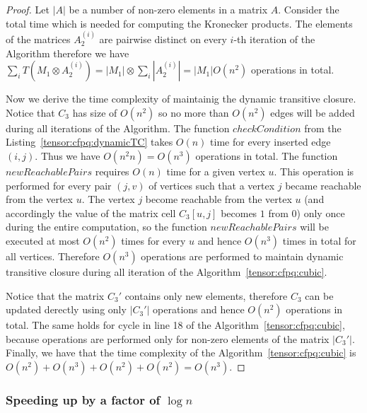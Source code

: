 \begin{proof}
 Let $|A|$ be a number of non-zero elements in a matrix $A$. Consider the total time which is needed for computing the Kronecker products. The elements of the matrices $A_2^{(i)}$ are pairwise distinct on every $i$-th iteration of the Algorithm therefore we have $\sum\limits_i{T(M_1 \otimes A_2^{(i)})} = |M_1| \otimes \sum\limits_i {|A_2^{(i)}|} = |M_1|O(n^2)$ operations in total. 


Now we derive the time complexity of maintainig the dynamic transitive closure. Notice that $C_3$ has size of $O(n^2)$ so no more than $O(n^2)$ edges will be added during all iterations of the Algorithm. The function $checkCondition$ from the Listing~\ref{tensor:cfpq:dynamicTC} takes $O(n)$ time for every inserted edge $(i, j)$. Thus we have $O(n^2n) = O(n^3)$ operations in total. The function $newReachablePairs$ requires $O(n)$ time for a given vertex $u$. This operation is performed for every pair $(j, v)$ of vertices such that a vertex $j$ became reachable from the vertex $u$. The vertex $j$ become reachable from the vertex $u$ (and accordingly the value of the matrix cell $C_3[u, j]$ becomes $1$ from $0$) only once during the entire computation, so the function $newReachablePairs$ will be executed at most $O(n^2)$ times for every $u$ and hence $O(n^3)$ times in total for all vertices. Therefore $O(n^3)$ operations are performed to maintain dynamic transitive closure during all iteration of the Algorithm~\ref{tensor:cfpq:cubic}.


Notice that the matrix $C_3'$ contains only new elements, therefore $C_3$ can be updated derectly using only $|C_3'|$ operations and hence $O(n^2)$ operations in total. The same holds for cycle in line 18 of the Algorithm~\ref{tensor:cfpq:cubic}, because operations are performed only for non-zero elements of the matrix $|C_3'|$. Finally, we have that the time complexity of the Algorithm~\ref{tensor:cfpq:cubic} is $O(n^2) + O(n^3) + O(n^2) + O(n^2) = O(n^3)$.
\end{proof}{}

\subsubsection{Speeding up by a factor of $\log n$}

